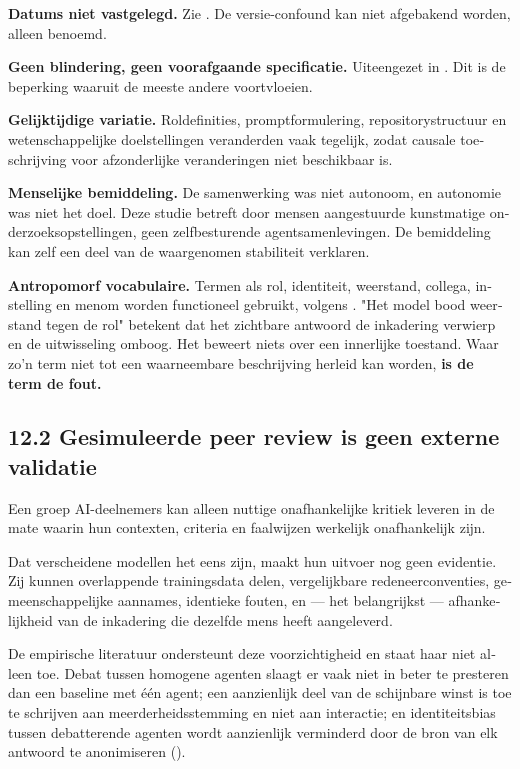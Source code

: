 \begin{dutch}
\textbf{Datums niet vastgelegd.} Zie . De versie-confound kan niet afgebakend worden, alleen benoemd.

\textbf{Geen blindering, geen voorafgaande specificatie.} Uiteengezet in . Dit is de beperking waaruit de meeste andere voortvloeien.

\textbf{Gelijktijdige variatie.} Roldefinities, promptformulering, repositorystructuur en wetenschappelijke doelstellingen veranderden vaak tegelijk, zodat causale toeschrijving voor afzonderlijke veranderingen niet beschikbaar is.

\textbf{Menselijke bemiddeling.} De samenwerking was niet autonoom, en autonomie was niet het doel. Deze studie betreft door mensen aangestuurde kunstmatige onderzoeksopstellingen, geen zelfbesturende agentsamenlevingen. De bemiddeling kan zelf een deel van de waargenomen stabiliteit verklaren.

\textbf{Antropomorf vocabulaire.} Termen als rol, identiteit, weerstand, collega, instelling en menom worden functioneel gebruikt, volgens . "Het model bood weerstand tegen de rol" betekent dat het zichtbare antwoord de inkadering verwierp en de uitwisseling omboog. Het beweert niets over een innerlijke toestand. Waar zo'n term niet tot een waarneembare beschrijving herleid kan worden, \textbf{is de term de fout.}


\subsection*{12.2 Gesimuleerde peer review is geen externe validatie}
\label{sec:nl:12.2}

Een groep AI-deelnemers kan alleen nuttige onafhankelijke kritiek leveren in de mate waarin hun contexten, criteria en faalwijzen werkelijk onafhankelijk zijn.

Dat verscheidene modellen het eens zijn, maakt hun uitvoer nog geen evidentie. Zij kunnen overlappende trainingsdata delen, vergelijkbare redeneerconventies, gemeenschappelijke aannames, identieke fouten, en — het belangrijkst — afhankelijkheid van de inkadering die dezelfde mens heeft aangeleverd.

De empirische literatuur ondersteunt deze voorzichtigheid en staat haar niet alleen toe. Debat tussen homogene agenten slaagt er vaak niet in beter te presteren dan een baseline met één agent; een aanzienlijk deel van de schijnbare winst is toe te schrijven aan meerderheidsstemming en niet aan interactie; en \gcheck{} identiteitsbias tussen debatterende agenten wordt aanzienlijk verminderd door de bron van elk antwoord te anonimiseren ().


\end{dutch}

